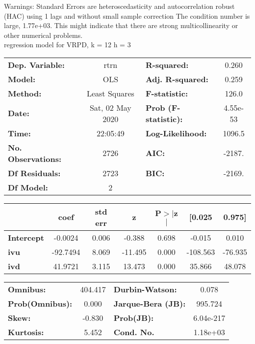 Warnings: \newline
 [1] Standard Errors are heteroscedasticity and autocorrelation robust (HAC) using 1 lags and without small sample correction \newline
 [2] The condition number is large, 1.77e+03. This might indicate that there are \newline
 strong multicollinearity or other numerical problems.\\ 

regression model for VRPD, k = 12 h = 3\begin{center}
\begin{tabular}{lclc}
\toprule
\textbf{Dep. Variable:}    &       rtrn       & \textbf{  R-squared:         } &     0.260   \\
\textbf{Model:}            &       OLS        & \textbf{  Adj. R-squared:    } &     0.259   \\
\textbf{Method:}           &  Least Squares   & \textbf{  F-statistic:       } &     126.0   \\
\textbf{Date:}             & Sat, 02 May 2020 & \textbf{  Prob (F-statistic):} &  4.55e-53   \\
\textbf{Time:}             &     22:05:49     & \textbf{  Log-Likelihood:    } &    1096.5   \\
\textbf{No. Observations:} &        2726      & \textbf{  AIC:               } &    -2187.   \\
\textbf{Df Residuals:}     &        2723      & \textbf{  BIC:               } &    -2169.   \\
\textbf{Df Model:}         &           2      & \textbf{                     } &             \\
\bottomrule
\end{tabular}
\begin{tabular}{lcccccc}
                   & \textbf{coef} & \textbf{std err} & \textbf{z} & \textbf{P$> |$z$|$} & \textbf{[0.025} & \textbf{0.975]}  \\
\midrule
\textbf{Intercept} &      -0.0024  &        0.006     &    -0.388  &         0.698        &       -0.015    &        0.010     \\
\textbf{ivu}       &     -92.7494  &        8.069     &   -11.495  &         0.000        &     -108.563    &      -76.935     \\
\textbf{ivd}       &      41.9721  &        3.115     &    13.473  &         0.000        &       35.866    &       48.078     \\
\bottomrule
\end{tabular}
\begin{tabular}{lclc}
\textbf{Omnibus:}       & 404.417 & \textbf{  Durbin-Watson:     } &     0.078  \\
\textbf{Prob(Omnibus):} &   0.000 & \textbf{  Jarque-Bera (JB):  } &   995.724  \\
\textbf{Skew:}          &  -0.830 & \textbf{  Prob(JB):          } & 6.04e-217  \\
\textbf{Kurtosis:}      &   5.452 & \textbf{  Cond. No.          } &  1.18e+03  \\
\bottomrule
\end{tabular}
\end{center}

